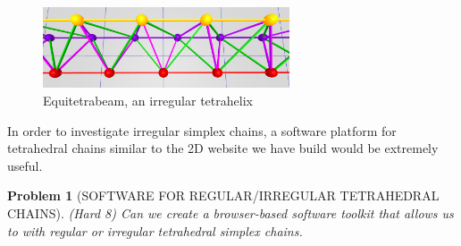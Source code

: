 \documentclass[11pt]{article}
\newtheorem{problem}{Problem}
\begin{document}
\begin{figure}
     \centering
     \includegraphics[width=0.65\textwidth]{figures/EquitetrabeamCloseUp.png}
     \caption{Equitetrabeam, an irregular tetrahelix}
  \label{fig:equitetrabeam}
\end{figure}

In order to investigate irregular simplex chains, a software platform for tetrahedral chains similar to the 2D website we have build would be
extremely useful.

\begin{problem}[SOFTWARE FOR REGULAR/IRREGULAR TETRAHEDRAL CHAINS]
(Hard 8) Can we create a browser-based software toolkit that allows us to with regular or irregular tetrahedral simplex chains.  
\end{problem}
\end{document}
